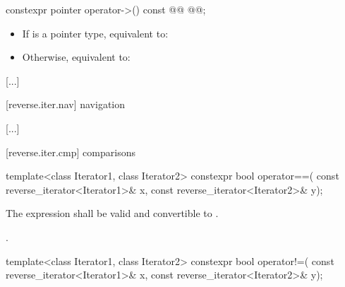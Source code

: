 \setcounter{Paras}{1}

%
\begin{itemdecl}
constexpr pointer operator->() const @@
  @@;
\end{itemdecl}

\begin{itemdescr}
\pnum
{}
\begin{addedblock}
\effects
\begin{itemize}
\item If  is a pointer type, equivalent to: 

\item Otherwise, equivalent to: 
\end{itemize}
\end{addedblock}
\end{itemdescr}

[...]

[reverse.iter.nav]{ navigation}

[...]

[reverse.iter.cmp]{ comparisons}

%
\begin{itemdecl}
template<class Iterator1, class Iterator2>
  constexpr bool operator==(
    const reverse_iterator<Iterator1>& x,
    const reverse_iterator<Iterator2>& y);
\end{itemdecl}

\begin{itemdescr}
\begin{addedblock}
\pnum
\constraints
The expression  shall be valid and
convertible to .
\end{addedblock}

\pnum
\returns
{}.
\end{itemdescr}

%
\begin{itemdecl}
template<class Iterator1, class Iterator2>
  constexpr bool operator!=(
    const reverse_iterator<Iterator1>& x,
    const reverse_iterator<Iterator2>& y);
\end{itemdecl}

